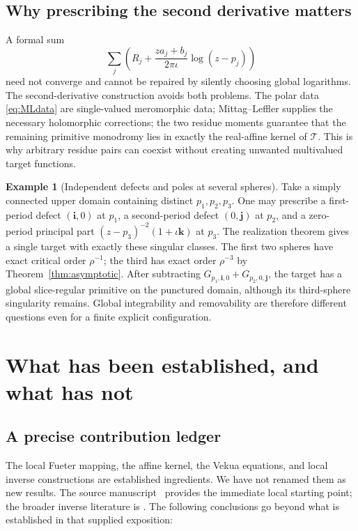 \documentclass[11pt,a4paper]{article}
\numberwithin{equation}{section}
\theoremstyle{definition}
\newtheorem{example}[theorem]{Example}
\theoremstyle{remark}
\newcommand{\T}{\mathcal T}
\begin{document}
\subsection{Why prescribing the second derivative matters}
A formal sum
\[
 \sum_j\left(R_j+\frac{za_j+b_j}{2\pi\iota}\log(z-p_j)\right)
\]
need not converge and cannot be repaired by silently choosing global
logarithms. The second-derivative construction avoids both problems.
The polar data \eqref{eq:MLdata} are single-valued meromorphic data;
Mittag--Leffler supplies the necessary holomorphic corrections; the two
residue moments guarantee that the remaining primitive monodromy lies in
exactly the real-affine kernel of $\T$. This is why arbitrary residue pairs
can coexist without creating unwanted multivalued target functions.

\begin{example}[Independent defects and poles at several spheres]
\label{ex:several}
Take a simply connected upper domain containing distinct $p_1,p_2,p_3$.
One may prescribe a first-period defect $(\mathbf i,0)$ at $p_1$, a
second-period defect $(0,\mathbf j)$ at $p_2$, and a zero-period principal
part $(z-p_3)^{-2}(1+\iota\mathbf k)$ at $p_3$.
The realization theorem gives a single target with exactly these singular
classes. The first two spheres have exact critical order $\rho^{-1}$;
the third has exact order $\rho^{-3}$ by
Theorem~\ref{thm:asymptotic}. After subtracting
$G_{p_1,\mathbf i,0}+G_{p_2,0,\mathbf j}$, the target has a global
slice-regular primitive on the punctured domain, although its third-sphere
singularity remains. Global integrability and removability are therefore
different questions even for a finite explicit configuration.
\end{example}

\section{What has been established, and what has not}
\label{sec:assessment}

\subsection{A precise contribution ledger}
The local Fueter mapping, the affine kernel, the Vekua equations, and local
inverse constructions are established ingredients. We have not renamed them
as new results. The source manuscript~\cite{Source} provides the immediate
local starting point; the broader inverse literature is
\cite{CSS,CPSS,DQ}. The following conclusions go beyond what is established
in that supplied exposition:
\end{document}
